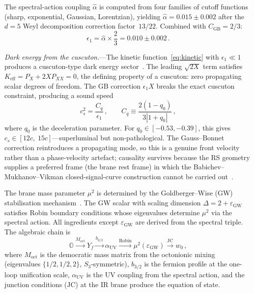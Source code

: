 \documentclass[aps,prl,twocolumn,superscriptaddress]{revtex4-2}
\newcommand{\CGB}{C_{\mathrm{GB}}}
\newcommand{\eps}{\epsilon_1}
\newcommand{\epsGW}{\varepsilon_{\mathrm{GW}}}
\newcommand{\ahat}{\hat{\alpha}}
\begin{document}
The spectral-action coupling $\ahat$ is computed from four families of
cutoff functions (sharp, exponential, Gaussian, Lorentzian), yielding
$\ahat = 0.015 \pm 0.002$ after the $d = 5$ Weyl decomposition correction
factor~$13/22$.  Combined with $\CGB = 2/3$:
\begin{equation}
  \eps = \ahat \times \frac{2}{3} = 0.010 \pm 0.002\,.
  \label{eq:eps1}
\end{equation}



\textit{Dark energy from the cuscuton.}---The kinetic
function~\eqref{eq:kinetic} with $\eps \ll 1$ produces a cuscuton-type dark
energy sector~\cite{Afshordi2007}.  The leading $\sqrt{2X}$ term satisfies
$K_{\mathrm{eff}} = P_X + 2X P_{XX} = 0$, the defining property of a
cuscuton: zero propagating scalar degrees of freedom.  The GB correction
$\eps X$ breaks the exact cuscuton constraint, producing a sound speed
\begin{equation}
  c_s^2 = \frac{C_q}{\eps}\,,\qquad
  C_q \equiv \frac{2(1 - q_0)}{3|1 + q_0|}\,,
  \label{eq:cs}
\end{equation}
where $q_0$ is the deceleration parameter.  For $q_0 \in [-0.53, -0.39]$,
this gives $c_s \in [12c,\; 15c]$---superluminal but non-pathological.  The
Gauss--Bonnet correction reintroduces a propagating mode, so this is a genuine
front velocity rather than a phase-velocity artefact; causality survives because
the RS geometry supplies a preferred frame (the brane rest frame) in which the
Babichev--Mukhanov--Vikman closed-signal-curve construction cannot be carried
out~\cite{Babichev2008,Bruneton2007}.

The brane mass parameter $\mu^2$ is determined by the Goldberger--Wise (GW)
stabilisation mechanism~\cite{GW1999}.  The GW scalar with scaling dimension
$\Delta = 2 + \epsGW$ satisfies Robin boundary conditions whose eigenvalues
determine $\mu^2$ via the spectral action.  All ingredients except $\epsGW$
are derived from the spectral triple.  The algebraic chain is
\begin{equation}
  \mathbb{O} \xrightarrow{M_{\mathrm{oct}}}
  Y_f \xrightarrow{b_{3/2}}
  \alpha_{\mathrm{UV}} \xrightarrow{\text{Robin}}
  \mu^2(\epsGW) \xrightarrow{\text{JC}}
  w_0\,,
  \label{eq:algebraic-chain}
\end{equation}
where $M_{\mathrm{oct}}$ is the democratic mass matrix from the octonionic
mixing (eigenvalues $\{1/2, 1/2, 2\}$, $S_3$-symmetric), $b_{3/2}$ is the
fermion profile at the one-loop unification scale, $\alpha_{\mathrm{UV}}$ is
the UV coupling from the spectral action, and the junction conditions (JC) at
the IR brane produce the equation of state.
\end{document}
